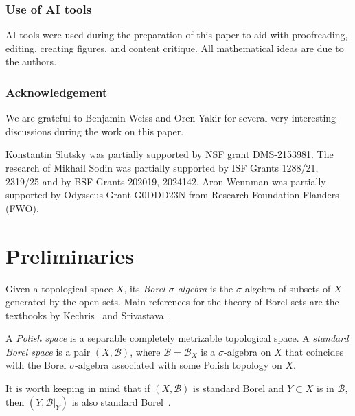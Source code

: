 \documentclass[11pt]{paper}
\begin{document}
\subsubsection*{Use of AI tools}
AI tools were used during the preparation of this paper to aid
with proofreading, editing, creating figures, and content critique. All
mathematical ideas are due to the authors.


\subsubsection*{Acknowledgement}
We are grateful to Benjamin Weiss and Oren Yakir
for several very interesting discussions during the work on this paper.

Konstantin Slutsky was partially supported by NSF grant DMS-2153981.
The research of Mikhail Sodin was partially supported by ISF Grants 1288/21, 2319/25
and by BSF Grants 202019, 2024142. Aron Wennman was partially supported by Odysseus
Grant G0DDD23N from Research Foundation Flanders (FWO).



\section{Preliminaries}
Given a topological space $X$, its \emph{Borel \(\sigma\)-algebra} is the \(\sigma\)-algebra of subsets
of $X$ generated by the open sets. Main references for the theory of Borel sets are the textbooks by Kechris~\cite{Kechris} and Srivastava~\cite{Srivastava}.

A \emph{Polish space} is a separable completely metrizable topological space.
A \emph{standard Borel space} is a pair \((X, \mathscr B)\), where \(\mathscr B = \mathscr B_X\)
is a \(\sigma\)-algebra on
\(X\) that coincides with the Borel \(\sigma\)-algebra associated with  some Polish topology on \(X\).

It is worth keeping in mind that if $(X, \mathscr B)$ is standard Borel and $Y\subset X$ is in
$\mathscr B$, then $(Y, \mathscr B |_{Y})$ is also standard Borel~\cite[13.4]{Kechris}.
\end{document}
